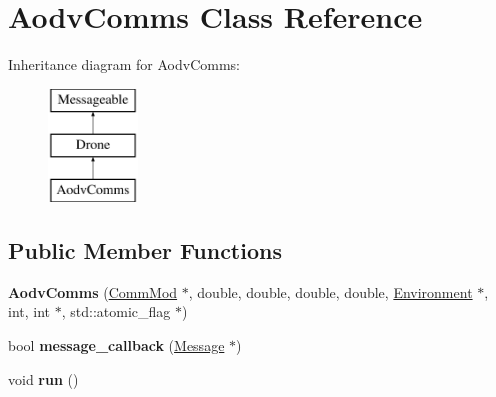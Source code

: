 \hypertarget{class_aodv_comms}{}\section{Aodv\+Comms Class Reference}
\label{class_aodv_comms}
Inheritance diagram for Aodv\+Comms\+:\begin{figure}[H]
\begin{center}
\leavevmode
\includegraphics[height=3.000000cm]{class_aodv_comms}
\end{center}
\end{figure}
\subsection*{Public Member Functions}
\begin{DoxyCompactItemize}
\item 
{\bfseries Aodv\+Comms} (\hyperlink{class_comm_mod}{Comm\+Mod} $\ast$, double, double, double, double, \hyperlink{class_environment}{Environment} $\ast$, int, int $\ast$, std\+::atomic\+\_\+flag $\ast$)\hypertarget{class_aodv_comms_a43dc09bb5e5044d8f5225be299a769aa}{}\label{class_aodv_comms_a43dc09bb5e5044d8f5225be299a769aa}

\item 
bool {\bfseries message\+\_\+callback} (\hyperlink{class_message}{Message} $\ast$)\hypertarget{class_aodv_comms_a88415cb9bf1c1afaf390763e4b77876b}{}\label{class_aodv_comms_a88415cb9bf1c1afaf390763e4b77876b}

\item 
void {\bfseries run} ()\hypertarget{class_aodv_comms_adbb3acdf25009338e22315ac6aa63f16}{}\label{class_aodv_comms_adbb3acdf25009338e22315ac6aa63f16}

\end{DoxyCompactItemize}
